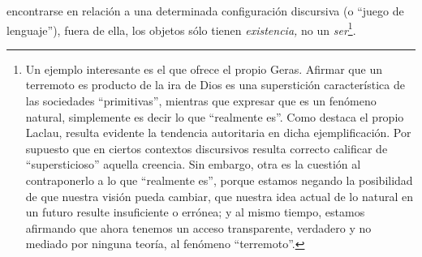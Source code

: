 encontrarse en relación a una determinada configuración discursiva (o \enquote{juego de lenguaje}), fuera de ella, los objetos sólo tienen \emph{existencia,} no un \emph{ser}\footnote{Un ejemplo interesante es el que ofrece el propio Geras. Afirmar que un terremoto es producto de la ira de Dios es una superstición característica de las sociedades \enquote{primitivas}, mientras que expresar que es un fenómeno natural, simplemente es decir lo que \enquote{realmente es}. Como destaca el propio Laclau, resulta evidente la tendencia autoritaria en dicha ejemplificación. Por supuesto que en ciertos contextos discursivos  resulta correcto calificar de \enquote{supersticioso} aquella creencia. Sin embargo, otra es la cuestión al contraponerlo a lo que \enquote{realmente es}, porque estamos negando la posibilidad de que nuestra visión pueda cambiar, que nuestra idea actual de lo natural en un futuro resulte insuficiente o errónea; y al mismo tiempo, estamos afirmando que ahora tenemos un acceso transparente, verdadero y no mediado por ninguna teoría, al fenómeno \enquote{terremoto}.}.

